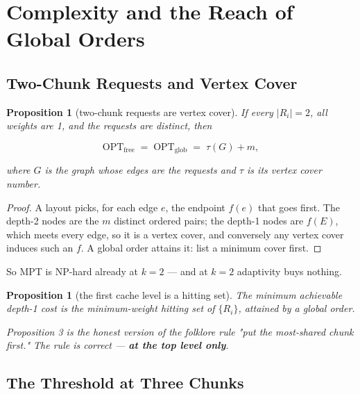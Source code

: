 \documentclass[11pt]{article}
\theoremstyle{plain}
\newtheorem{proposition}[theorem]{Proposition}
\begin{document}
\section{Complexity and the Reach of Global Orders}

\subsection{Two-Chunk Requests and Vertex Cover}

\begin{proposition}[two-chunk requests are vertex cover]
If every $|R_i| = 2$, all weights are 1, and the requests are distinct, then

\begin{equation}
\mathrm{OPT}_{\mathrm{free}} \;=\; \mathrm{OPT}_{\mathrm{glob}} \;=\; \tau(G) + m,
\end{equation}

where $G$ is the graph whose edges are the requests and $\tau$ is its vertex cover number.
\end{proposition}
\begin{proof}
A layout picks, for each edge $e$, the endpoint $f(e)$ that goes first. The depth-2 nodes are the $m$ distinct ordered pairs; the depth-1 nodes are $f(E)$, which meets every edge, so it is a vertex cover, and conversely any vertex cover induces such an $f$. A global order attains it: list a minimum cover first. 
\end{proof}

So MPT is NP-hard already at $k=2$ --- and at $k=2$ adaptivity buys nothing.

\begin{proposition}[the first cache level is a hitting set]
The minimum achievable depth-1 cost is the minimum-weight hitting set of $\{R_i\}$, attained by a global order.

Proposition 3 is the honest version of the folklore rule \emph{"put the most-shared chunk first."} The rule is correct --- \textbf{at the top level only}.
\end{proposition}
\subsection{The Threshold at Three Chunks}
\end{document}
